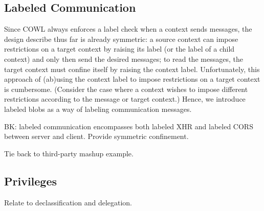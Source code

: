 

\subsection{Labeled Communication}
\label{sec:system:communication}
Since COWL always enforces a label check when a context sends
messages, the design describe thus far is already symmetric: a source
context can impose restrictions on a target context by raising its
label (or the label of a child context) and only then send the desired
messages; to read the messages, the target context must confine itself
by raising the context label.
%
Unfortunately, this approach of (ab)using the context label to impose
restrictions on a target context is cumbersome.
%
(Consider the case where a context wishes to impose different
restrictions according to the message or target context.)
%
Hence, we introduce labeled blobs as a way of labeling communication
messages.


BK: labeled communication encompasses both labeled XHR and labeled
CORS between server and client. Provide symmetric confinement.

Tie back to third-party mashup example.

\subsection{Privileges}
\label{sec:system:privileges}
Relate to declassification and delegation.

\break


 
